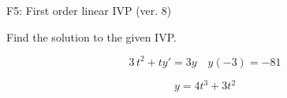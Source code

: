 \begin{exercise}
  \begin{exerciseTitle}F5: First order linear IVP (ver. 8)\end{exerciseTitle}
  \begin{exerciseStatement}
    
Find the solution to the given IVP.

    
\[3 \, t^{2} +ty'= 3 y \hspace{1em} y( -3 ) = -81\]

  \end{exerciseStatement}
  \begin{exerciseAnswer}
    
\[y= 4 t^ 3 +3 t^{2}\]

  \end{exerciseAnswer}
\end{exercise}
